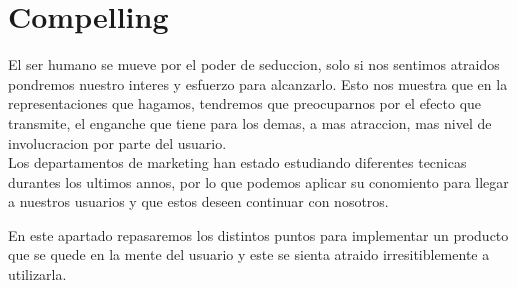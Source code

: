 \newpage
\section{Compelling}
El ser humano se mueve por el poder de seduccion, solo si nos sentimos atraidos pondremos nuestro
interes y esfuerzo para alcanzarlo. Esto nos muestra que en la representaciones que hagamos, tendremos que 
preocuparnos por el efecto que transmite, el enganche que tiene para los demas, a mas atraccion, mas
nivel de involucracion por parte del usuario.\\

Los departamentos de marketing han estado estudiando diferentes tecnicas durantes los ultimos annos,
por lo que podemos aplicar su conomiento para llegar a nuestros usuarios y que estos deseen continuar con nosotros.

En este apartado repasaremos los distintos puntos para implementar un producto que se quede en la mente
del usuario y este se sienta atraido irresitiblemente a utilizarla.  


%




